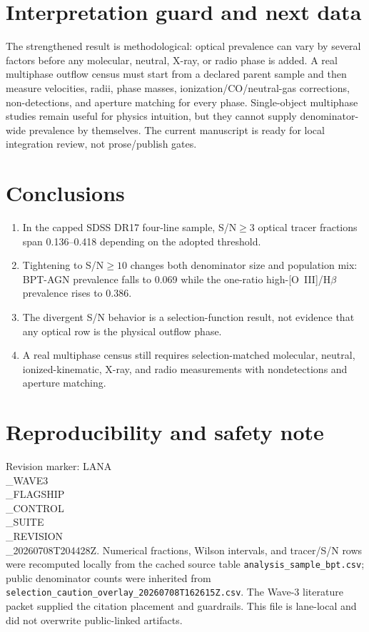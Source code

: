 \documentclass[twocolumn]{aastex631}
\begin{document}
\section{Interpretation guard and next data}
The strengthened result is methodological: optical prevalence can vary by several factors before any molecular, neutral, X-ray, or radio phase is added.  A real multiphase outflow census must start from a declared parent sample and then measure velocities, radii, phase masses, ionization/CO/neutral-gas corrections, non-detections, and aperture matching for every phase.  Single-object multiphase studies remain useful for physics intuition, but they cannot supply denominator-wide prevalence by themselves.  The current manuscript is ready for local integration review, not prose/publish gates.


\section{Conclusions}\label{sec:m3p1_conclusions}
\begin{enumerate}
\item In the capped SDSS DR17 four-line sample, S/N$\geq3$ optical tracer fractions span 0.136--0.418 depending on the adopted threshold.
\item Tightening to S/N$\geq10$ changes both denominator size and population mix: BPT-AGN prevalence falls to 0.069 while the one-ratio high-[O~III]/H$\beta$ prevalence rises to 0.386.
\item The divergent S/N behavior is a selection-function result, not evidence that any optical row is the physical outflow phase.
\item A real multiphase census still requires selection-matched molecular, neutral, ionized-kinematic, X-ray, and radio measurements with nondetections and aperture matching.
\end{enumerate}

\section*{Reproducibility and safety note}
Revision marker: LANA\\_WAVE3\\_FLAGSHIP\\_CONTROL\\_SUITE\\_REVISION\\_20260708T204428Z.  Numerical fractions, Wilson intervals, and tracer/S/N rows were recomputed locally from the cached source table \texttt{analysis\_sample\_bpt.csv}; public denominator counts were inherited from \texttt{selection\_caution\_overlay\_20260708T162615Z.csv}.  The Wave-3 literature packet supplied the citation placement and guardrails.  This file is lane-local and did not overwrite public-linked artifacts.
\end{document}
